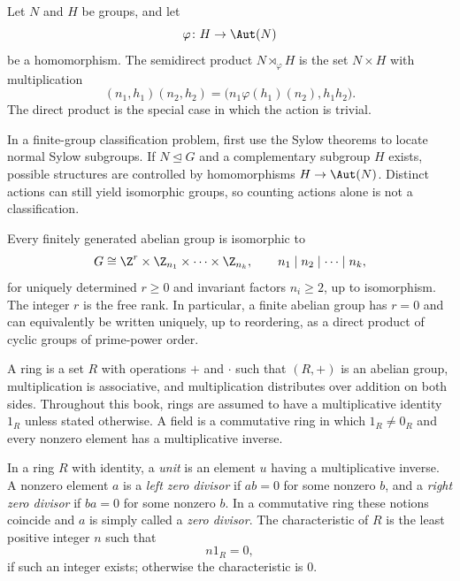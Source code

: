     \begin{definition}
        Let $N$ and $H$ be groups, and let
        \[
            \varphi\colon H\to\Aut(N)
        \]
        be a homomorphism. The semidirect product $N\rtimes_\varphi H$ is the
        set $N\times H$ with multiplication
        \[
            (n_1,h_1)(n_2,h_2)
            =
            \bigl(n_1\varphi(h_1)(n_2),h_1h_2\bigr).
        \]
        The direct product is the special case in which the action is trivial.
    \end{definition}

    \begin{strategy}
        In a finite-group classification problem, first use the Sylow theorems
        to locate normal Sylow subgroups. If $N\trianglelefteq G$ and a
        complementary subgroup $H$ exists, possible structures are controlled
        by homomorphisms $H\to\Aut(N)$. Distinct actions can still yield
        isomorphic groups, so counting actions alone is not a classification.
    \end{strategy}

    \begin{theorem}
        Every finitely generated abelian group is isomorphic to
        \[
            G
            \cong
            \Z^r\times
            \Z_{n_1}\times\cdots\times\Z_{n_k},
            \qquad
            n_1\mid n_2\mid\cdots\mid n_k,
        \]
        for uniquely determined $r\geq0$ and invariant factors
        $n_i\geq2$, up to isomorphism. The integer $r$ is the free rank.
        In particular, a finite abelian group has $r=0$ and can equivalently be
        written uniquely, up to reordering, as a direct product of cyclic groups
        of prime-power order.
    \end{theorem}

    \begin{definition}
        A ring is a set $R$ with operations $+$ and $\cdot$ such that
        $(R,+)$ is an abelian group, multiplication is associative, and
        multiplication distributes over addition on both sides. Throughout this
        book, rings are assumed to have a multiplicative identity $1_R$ unless
        stated otherwise. A field is a commutative ring in which $1_R\neq0_R$
        and every nonzero element has a multiplicative inverse.
    \end{definition}


    \begin{definition}
        In a ring $R$ with identity, a \emph{unit} is an element $u$ having a
        multiplicative inverse. A nonzero element $a$ is a \emph{left zero
        divisor} if $ab=0$ for some nonzero $b$, and a \emph{right zero divisor}
        if $ba=0$ for some nonzero $b$. In a commutative ring these notions
        coincide and $a$ is simply called a \emph{zero divisor}. The
        characteristic of $R$ is the least
        positive integer $n$ such that
        \[
            n1_R=0,
        \]
        if such an integer exists; otherwise the characteristic is $0$.
    \end{definition}

